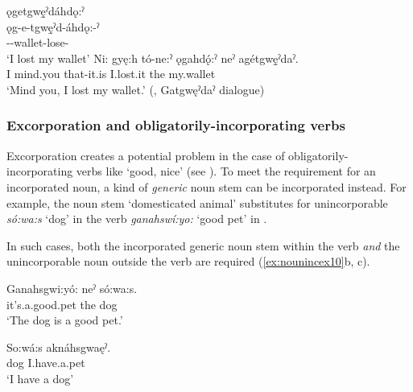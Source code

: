 \ea\label{ex:nounincex90}
\ea ǫgetgwę̱ˀdáhdǫ:ˀ\\\label{ex:nounincex90a}
\gll ǫg-e-tgwę̱ˀd-áhdǫ:-ˀ\\
 -{\joinerE}-wallet-lose-{\punctual} \\
\glt `I lost my wallet'
\ex \label{ex:nounincex90b}
\gll Ni: gyę:h tó-ne:ˀ ǫgahdǫ́:ˀ neˀ agétgwę̱ˀdaˀ. \\
I mind.you that-it.is I.lost.it the my.wallet\\
\glt ‘Mind you, I lost my wallet.’ (\cite[184]{mithun_watewayestanih_1984}, Gatgwęˀdaˀ dialogue)
\z
\z

\subsubsection*{Excorporation and obligatorily-incorporating verbs} \label{ch:Excorporation and obligatorily-incorporating verbs}
Excorporation creates a potential problem in the case of obligatorily-incorporating verbs like  ‘good, nice’ (see ). To meet the requirement for an incorporated noun, a kind of \emph{generic} noun stem can be incorporated instead. For example, the noun stem  ‘domesticated animal’ substitutes for unincorporable \textit{só:wa:s} ‘dog’ in the verb \textit{ganahswí:yo:} ‘good pet’ in .

In such cases, both the incorporated generic noun stem within the verb \emph{and} the unincorporable noun outside the verb are required (\ref{ex:nounincex10}b, c).

\ea\label{ex:nounincex10}
\ea\label{ex:nounincex10a}
\gll Ganahsgwi:yó: neˀ só:wa:s.\\
it’s.a.good.pet the dog\\
\glt ‘The dog is a good pet.’


\ex \label{ex:nounincex10b}
\gll So:wá:s aknáhsgwaęˀ.\\
dog I.have.a.pet\\
\glt ‘I have a dog’ 

